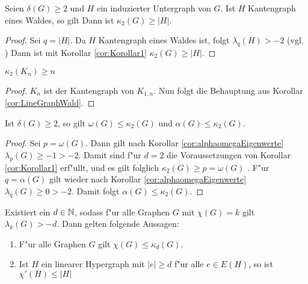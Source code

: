 \begin{corollary}
  \label{cor:LineGraphWald}
  Seien $\delta(G) \geq 2$ und $H$ ein induzierter Untergraph von $G$. Ist $H$ Kantengraph eines Waldes, so gilt 
  Dann ist $\kappa_{2}(G)\geq \left|H\right|$.
\end{corollary}

\begin{proof}
  Sei $q = |H|$. Da $H$ Kantengraph eines Waldes ist, folgt $\lambda_{q}(H) > -2$ (vgl. \cite[3.4.10]{zbMATH05625877}) 
  Dann ist mit Korollar \ref{cor:Korollar1} $\kappa_{2}\left( G \right) \geq \left| H\right|$.
\end{proof}

\begin{corollary}[Klotz]
  $\kappa_{2}\left( K_n \right) \geq n$
\end{corollary}

\begin{proof}
  $K_n$ ist der Kantengraph von $K_{1,n}$. Nun folgt die Behauptung aus Korollar \ref{cor:LineGraphWald}.
\end{proof}
\begin{corollary}
  Ist $\delta\left( G \right) \geq 2$, so gilt $\omega\left( G \right)\leq \kappa_{2}\left( G \right)$ und $\alpha\left( G \right)\leq \kappa_{2}\left( G \right)$.
  \label{cor:alphaomegakrausz}
\end{corollary}

\begin{proof}
  Sei $p = \omega(G)$. Dann gilt nach Korollar \ref{cor:alphaomegaEigenwerte} $\lambda_{p}\left( G \right)\geq -1 > -2$. Damit sind f"ur $d=2$ die Voraussetzungen von Korollar \ref{cor:Korollar1} erf"ullt, und es gilt folglich $\kappa_{2}\left( G \right)\geq p = \omega\left( G \right)$ .
  F"ur $q=\alpha\left( G \right)$ gilt wieder nach Korollar \ref{cor:alphaomegaEigenwerte} $\lambda_{q}\left( G \right)\geq 0 > -2$. Damit folgt $\alpha\left( G \right) \leq \kappa_{2}\left( G \right)$.
\end{proof}

\begin{theorem}
  \label{thm:MainTheorem}
  Existiert ein $d\in {\mathbb{N}}$, sodass f"ur alle  Graphen $G$ mit $\chi(G) = k $ gilt $ \lambda_{k}(G) > -d$. Dann gelten folgende Aussagen:
  \begin{enumerate}[label=(\alph*)]
    \item F"ur alle Graphen $G$ gilt $\chi(G) \leq \kappa_d (G)$.
    \item  Ist $H$ ein linearer Hypergraph mit $\left|e\right| \geq d$ f"ur alle $e\in E(H)$, so ist $\chi'\left( H \right)\leq \left|H\right| $
  \end{enumerate}
\end{theorem}

